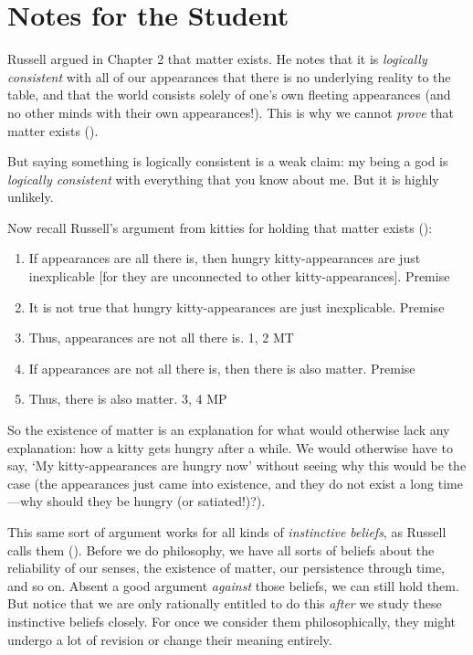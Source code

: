 \documentclass[oneside,letterpaper,12pt]{book}
\begin{document}
\protect\hypertarget{link2HCH0004}{}{}
\pagebreak
\section{Notes for the Student}
\par Russell argued in Chapter 2 that matter exists. He notes that it is \textit{logically consistent} with all of our appearances that there is no underlying reality to the table, and that the world consists solely of one's own fleeting appearances (and no other minds with their own appearances!). This is why we cannot \textit{prove} that matter exists (\pageref{self}).
\par But saying something is logically consistent is a weak claim: my being a god is \textit{logically consistent} with everything that you know about me. But it is highly unlikely.
\par Now recall Russell's argument from kitties for holding that matter exists (\pageref{kitty}):
\begin{enumerate}%
	\item If appearances are all there is, then hungry kitty-appearances are just inexplicable [for they are unconnected to other kitty-appearances]. \hfill Premise
	\item It is not true that hungry kitty-appearances are just inexplicable. \hfill Premise
	\item Thus, appearances are not all there is. \hfill 1, 2 MT
	\item If appearances are not all there is, then there is also matter. \hfill Premise
	\item Thus, there is also matter. \hfill 3, 4 MP
\end{enumerate}
So the existence of matter is an explanation for what would otherwise lack any explanation: how a kitty gets hungry after a while. We would otherwise have to say, `My kitty-appearances are hungry now' without seeing why this would be the case (the appearances just came into existence, and they do not exist a long time---why should they be hungry (or satiated!)?).
\par This same sort of argument works for all kinds of \textit{instinctive beliefs}, as Russell calls them (\pageref{instinctive}). Before we do philosophy, we have all sorts of beliefs about the reliability of our senses, the existence of matter, our persistence through time, and so on. Absent a good argument \textit{against} those beliefs, we can still hold them. But notice that we are only rationally entitled to do this \textit{after} we study these instinctive beliefs closely. For once we consider them philosophically, they might undergo a lot of revision or change their meaning entirely. 
\end{document}
